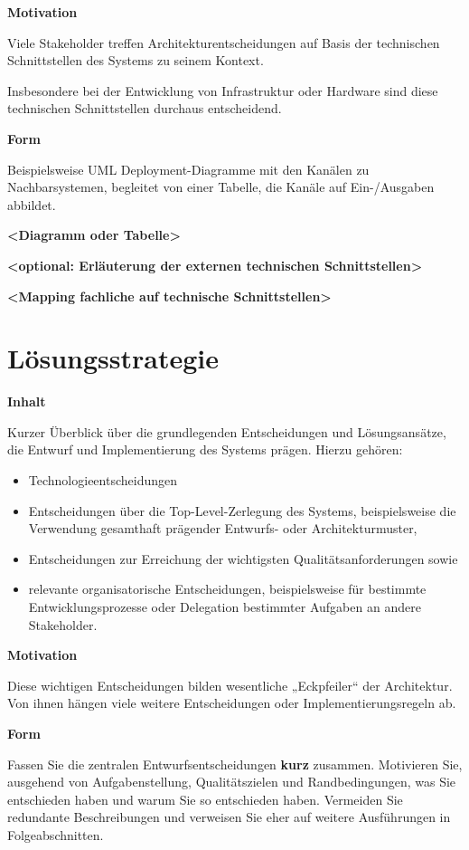 \documentclass[a4paper,12pt]{article}
\begin{document}
\textbf{Motivation}

Viele Stakeholder treffen Architekturentscheidungen auf Basis der
technischen Schnittstellen des Systems zu seinem Kontext.

Insbesondere bei der Entwicklung von Infrastruktur oder Hardware sind
diese technischen Schnittstellen durchaus entscheidend.

\textbf{Form}

Beispielsweise UML Deployment-Diagramme mit den Kanälen zu
Nachbarsystemen, begleitet von einer Tabelle, die Kanäle auf
Ein-/Ausgaben abbildet.

\textbf{\textless Diagramm oder Tabelle\textgreater{}}

\textbf{\textless optional: Erläuterung der externen technischen
Schnittstellen\textgreater{}}

\textbf{\textless Mapping fachliche auf technische
Schnittstellen\textgreater{}}
\newpage
\section{Lösungsstrategie}\label{section-solution-strategy}

\textbf{Inhalt}

Kurzer Überblick über die grundlegenden Entscheidungen und
Lösungsansätze, die Entwurf und Implementierung des Systems prägen.
Hierzu gehören:

\begin{itemize}
\item
  Technologieentscheidungen
\item
  Entscheidungen über die Top-Level-Zerlegung des Systems,
  beispielsweise die Verwendung gesamthaft prägender Entwurfs- oder
  Architekturmuster,
\item
  Entscheidungen zur Erreichung der wichtigsten Qualitätsanforderungen
  sowie
\item
  relevante organisatorische Entscheidungen, beispielsweise für
  bestimmte Entwicklungsprozesse oder Delegation bestimmter Aufgaben an
  andere Stakeholder.
\end{itemize}

\textbf{Motivation}

Diese wichtigen Entscheidungen bilden wesentliche „Eckpfeiler`` der
Architektur. Von ihnen hängen viele weitere Entscheidungen oder
Implementierungsregeln ab.

\textbf{Form}

Fassen Sie die zentralen Entwurfsentscheidungen \textbf{kurz} zusammen.
Motivieren Sie, ausgehend von Aufgabenstellung, Qualitätszielen und
Randbedingungen, was Sie entschieden haben und warum Sie so entschieden
haben. Vermeiden Sie redundante Beschreibungen und verweisen Sie eher
auf weitere Ausführungen in Folgeabschnitten.
\end{document}
